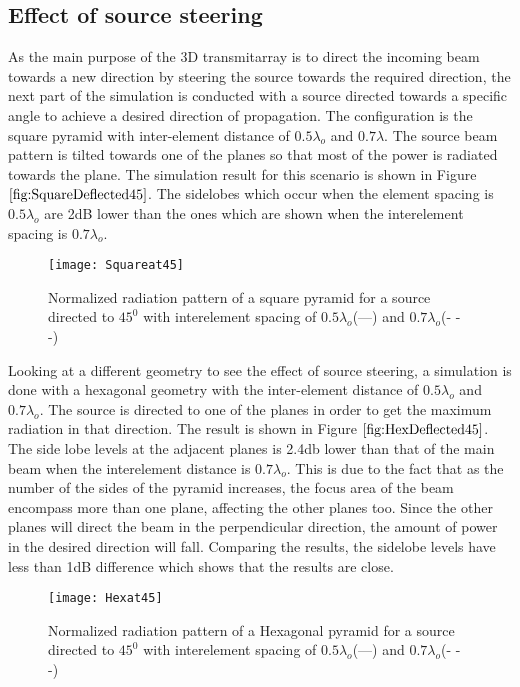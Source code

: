\documentclass[titlepage]{article}
\begin{document}
\subsection{Effect of source steering}
As the main purpose of the 3D transmitarray is to direct the incoming beam towards a new direction by steering the source towards the required direction, the next part of the simulation is conducted with a source directed towards a specific angle to achieve a desired direction of propagation. The configuration is the square pyramid with inter-element distance of $0.5\lambda_o$ and $0.7\lambda$. The source beam pattern is tilted towards one of the planes so that most of the power is radiated towards the plane. The simulation result for this scenario is shown in Figure $\ref{fig:SquareDeflected45}$. The sidelobes which occur when the element spacing is $0.5\lambda_o$ are 2dB lower than the ones which are shown when the interelement spacing is $0.7\lambda_o$.
\begin{figure}[!hbp]
\centering
\texttt{[image: Squareat45]}
\caption{Normalized radiation pattern of a square pyramid for a source directed to $45^0 $ with interelement spacing of $0.5\lambda_o$(---) and $0.7\lambda_o$(- - -)}
\label{fig:SquareDeflected45}
\end{figure}
\newline
Looking at a different geometry to see the effect of source steering, a simulation is done with a hexagonal geometry with the inter-element distance of $0.5\lambda_o$ and $0.7\lambda_o$. The source is directed to one of the planes in order to get the maximum radiation in that direction. The result is shown in Figure $\ref{fig:HexDeflected45}$. The side lobe levels at the adjacent planes is 2.4db lower than that of the main beam when the interelement distance is $0.7\lambda_o$. This is due to the fact that as the number of the sides of the pyramid increases, the focus area of the beam encompass more than one plane, affecting the other planes too. Since the other planes will direct the beam in the perpendicular direction, the amount of power in the desired direction will fall. Comparing the results, the sidelobe levels have less than 1dB difference which shows that the results are close.
\begin{figure}[!hbp]
\centering
\texttt{[image: Hexat45]}
\caption{Normalized radiation pattern of a Hexagonal pyramid for a source directed to $45^0 $ with interelement spacing of $0.5\lambda_o$(---) and $0.7\lambda_o$(- - -)}
\label{fig:HexDeflected45}
\end{figure}
\end{document}
